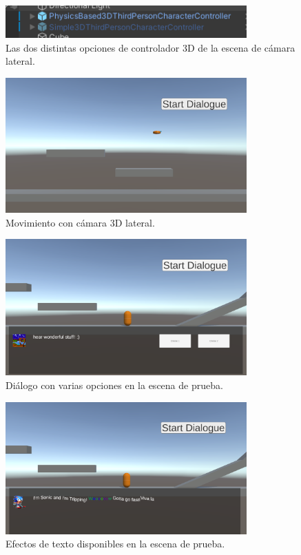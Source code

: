  \begin{figure}[H]
   \centering
     \includegraphics[width=350px,clip=true]{3DSideScrollerMovementControllerOptionsTestScene.png}
   \caption{Las dos distintas opciones de controlador 3D de la escena de cámara lateral.}
   \label{fig:3dSideControllers}
\end{figure}
 
\begin{figure}[H]
   \centering
     \includegraphics[width=350px,clip=true]{3DSideScrollerMovementControllerTestScene.png}
   \caption{Movimiento con cámara 3D lateral.}
   \label{fig:3dSideMovement}
\end{figure}

\begin{figure}[H]
   \centering
     \includegraphics[width=350px,clip=true]{3DSideScrollerMultipleChoiceTestScene.png}
   \caption{Diálogo con varias opciones en la escena de prueba.}
   \label{fig:3dSideDialogue}
\end{figure}

\begin{figure}[H]
   \centering
     \includegraphics[width=350px,clip=true]{3DSideScrollerTextEffectTestScene.png}
   \caption{Efectos de texto disponibles en la escena de prueba.}
   \label{fig:3dSideEffects}
\end{figure}

